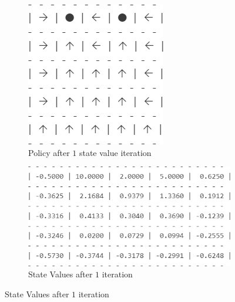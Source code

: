 \documentclass[11pt]{article}
\begin{document}
\begin{figure}
    \begin{subfigure}[t]{0.32\textwidth}
        \includegraphics[width=\textwidth]{img/3_1_b_it1_pol.png}
        \caption{Policy after $1$ state value iteration}
        \label{img:3_1_b_1t_pol}
    \end{subfigure}
    \hfill
    \begin{subfigure}[t]{0.65\textwidth}
        \includegraphics[width=\textwidth]{img/3_1_b_it1_grid.png}
        \caption{State Values after $1$ iteration}
        \label{img:3_1_b_1t_grd}
    \end{subfigure}


\end{figure}
\end{document}
